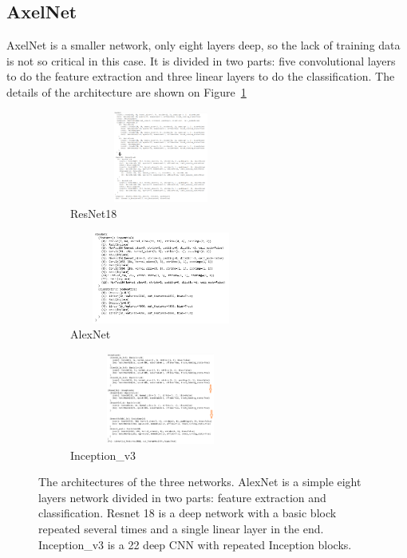 \subsection{AxelNet}
AxelNet is a smaller network, only eight layers deep, so the lack of training data is not so critical in this case. It is divided in two parts: five convolutional layers to do the feature extraction and three linear layers to do the classification.  The details of the architecture are shown on Figure~\ref{fig:resarchi}
\begin{figure}
\begin{subfigure}{.5\textwidth}
  \centering
  \includegraphics[width=6cm, height=3cm]{figures/03-Resnet_architecture}
  \caption{ResNet18}
  \label{fig:resarchi}
\end{subfigure}%
\begin{subfigure}{.5\textwidth}
  \centering
  \includegraphics[width=6cm, height=3cm]{figures/03-alexnet_architecture}
  \caption{AlexNet}
  \label{fig:alexarchi}
\end{subfigure}
\begin{subfigure}{.5\textwidth}
  \centering
  \includegraphics[width=6cm, height=3cm]{figures/03-inception_architecture}
  \caption{Inception\_v3}
  \label{fig:googarch}
\end{subfigure}
\caption[Networks architectures]{The architectures of the three networks. AlexNet is a simple eight layers network divided in two parts: feature extraction and classification. Resnet 18 is a deep network with a basic block repeated several times and a single linear layer in the end. Inception\_v3 is a 22 deep CNN with repeated Inception blocks.}
\end{figure}

